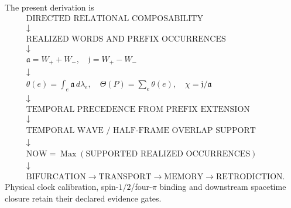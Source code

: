 The present derivation is
\[
\boxed{
\begin{aligned}
&\text{DIRECTED RELATIONAL COMPOSABILITY}\\
&\downarrow\\
&\text{REALIZED WORDS AND PREFIX OCCURRENCES}\\
&\downarrow\\
&\mathfrak a=W_++W_-,\quad \mathfrak j=W_+-W_-\\
&\downarrow\\
&\theta(e)=\int_e\mathfrak a\,d\lambda_e,\quad
\Theta(P)=\sum_e\theta(e),\quad
\chi=\mathfrak j/\mathfrak a\\
&\downarrow\\
&\text{TEMPORAL PRECEDENCE FROM PREFIX EXTENSION}\\
&\downarrow\\
&\text{TEMPORAL WAVE / HALF-FRAME OVERLAP SUPPORT}\\
&\downarrow\\
&\text{NOW}=\operatorname{Max}(\text{SUPPORTED REALIZED OCCURRENCES})\\
&\downarrow\\
&\text{BIFURCATION}\to\text{TRANSPORT}\to\text{MEMORY}\to\text{RETRODICTION}.
\end{aligned}
}
\]
Physical clock calibration, spin-$1/2$/four-$\pi$ binding and downstream spacetime closure retain their declared evidence gates.
